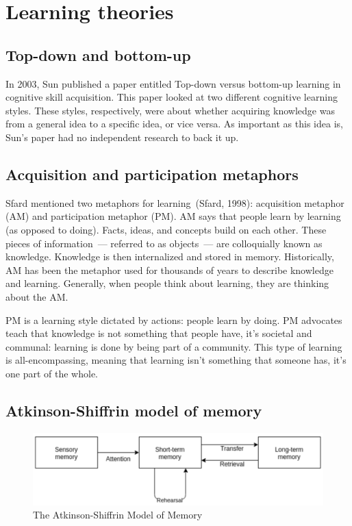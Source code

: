 \section{Learning theories}
\subsection{Top-down and bottom-up}
In 2003, Sun published a paper entitled Top-down versus bottom-up learning in cognitive skill acquisition. This paper looked at two different cognitive learning styles. These styles, respectively, were about whether acquiring knowledge was from a general idea to a specific idea, or vice versa. As important as this idea is, Sun's paper had no independent research to back it up.

\subsection{Acquisition and participation metaphors}
Sfard mentioned two metaphors for learning~(Sfard, 1998): acquisition metaphor (AM) and participation metaphor (PM). AM says that people learn by learning (as opposed to doing). Facts, ideas, and concepts build on each other. These pieces of information~--- referred to as objects~--- are colloquially known as knowledge. Knowledge is then internalized and stored in memory. Historically, AM has been the metaphor used for thousands of years to describe knowledge and learning. Generally, when people think about learning, they are thinking about the AM.

PM is a learning style dictated by actions: people learn by doing. PM advocates teach that knowledge is not something that people have, it's societal and communal: learning is done by being part of a community. This type of learning is all-encompassing, meaning that learning isn't something that someone has, it's one part of the whole.

\subsection{Atkinson-Shiffrin model of memory}
\begin{figure}
  \centering
  \includegraphics[width=\textwidth]{figures/chapter2/atkinson-model-of-memory.png}
  \caption{The Atkinson-Shiffrin Model of Memory}
  \label{fig:atkinson-model-of-memory}
\end{figure}


